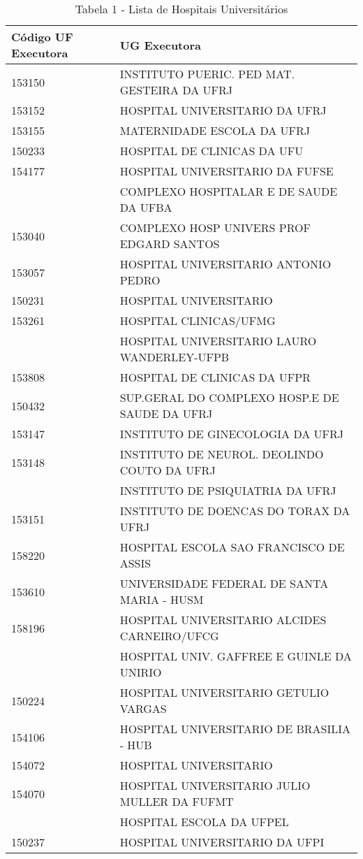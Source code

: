 \documentclass[
  letterpaper,
  DIV=11,
  numbers=noendperiod]{scrartcl}
\begin{document}
\begin{longtable}[t]{ll}
\caption{Tabela 1 - Lista de Hospitais Universitários}\\
\toprule
Código UF Executora & UG Executora\\
\midrule
153150 & INSTITUTO PUERIC. PED MAT. GESTEIRA DA UFRJ\\
153152 & HOSPITAL UNIVERSITARIO DA UFRJ\\
153155 & MATERNIDADE ESCOLA DA UFRJ\\
150233 & HOSPITAL DE CLINICAS DA UFU\\
154177 & HOSPITAL UNIVERSITARIO DA FUFSE\\
\addlinespace
150247 & COMPLEXO HOSPITALAR E DE SAUDE DA UFBA\\
153040 & COMPLEXO HOSP UNIVERS PROF EDGARD SANTOS\\
153057 & HOSPITAL UNIVERSITARIO ANTONIO PEDRO\\
150231 & HOSPITAL UNIVERSITARIO\\
153261 & HOSPITAL CLINICAS/UFMG\\
\addlinespace
153071 & HOSPITAL UNIVERSITARIO LAURO WANDERLEY-UFPB\\
153808 & HOSPITAL DE CLINICAS DA UFPR\\
150432 & SUP.GERAL DO COMPLEXO HOSP.E DE SAUDE DA UFRJ\\
153147 & INSTITUTO DE GINECOLOGIA DA UFRJ\\
153148 & INSTITUTO DE NEUROL. DEOLINDO COUTO DA UFRJ\\
\addlinespace
153149 & INSTITUTO DE PSIQUIATRIA DA UFRJ\\
153151 & INSTITUTO DE DOENCAS DO TORAX DA UFRJ\\
158220 & HOSPITAL ESCOLA SAO FRANCISCO DE ASSIS\\
153610 & UNIVERSIDADE FEDERAL DE SANTA MARIA - HUSM\\
158196 & HOSPITAL UNIVERSITARIO ALCIDES CARNEIRO/UFCG\\
\addlinespace
154035 & HOSPITAL UNIV. GAFFREE E GUINLE DA UNIRIO\\
150224 & HOSPITAL UNIVERSITARIO GETULIO VARGAS\\
154106 & HOSPITAL UNIVERSITARIO DE BRASILIA - HUB\\
154072 & HOSPITAL UNIVERSITARIO\\
154070 & HOSPITAL UNIVERSITARIO JULIO MULLER DA FUFMT\\
\addlinespace
154145 & HOSPITAL ESCOLA DA UFPEL\\
150237 & HOSPITAL UNIVERSITARIO DA UFPI\\

\end{longtable}
\end{document}

